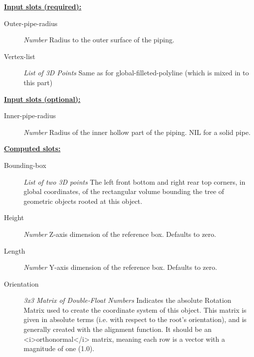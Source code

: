 \documentclass [11pt]{book}
\begin{document}
\begin{itemize}
\begin{figure}
\label{fig:ROUTE-PIPE}

\end{figure}





\textbf{
\underline{Input slots (required):}}

\begin{description}

\item [Outer-pipe-radius]
\emph{Number} Radius to the outer surface of the piping.


\item [Vertex-list]
\emph{List of 3D Points} Same as for global-filleted-polyline (which is mixed in to this part)


\end{description}






\textbf{
\underline{Input slots (optional):}}

\begin{description}

\item [Inner-pipe-radius]
\emph{Number} Radius of the inner hollow part of the piping. NIL for a solid pipe.


\end{description}






\textbf{
\underline{Computed slots:}}

\begin{description}

\item [Bounding-box]
\emph{List of two 3D points} The left front bottom and right rear top corners, in global coordinates,
of the rectangular volume bounding the tree of geometric objects rooted at this object.


\item [Height]
\emph{Number} Z-axis dimension of the reference box. Defaults to zero.


\item [Length]
\emph{Number} Y-axis dimension of the reference box. Defaults to zero.


\item [Orientation]
\emph{3x3 Matrix of Double-Float Numbers} Indicates the absolute Rotation Matrix used to create
the coordinate system of this object. This matrix is given in absolute terms (i.e. with
respect to the root's orientation), and is generally created with the alignment function.
It should be an <i>orthonormal</i> matrix, meaning each row is a vector with a magnitude
of one (1.0).



\end{description}
\end{itemize}
\end{document}
